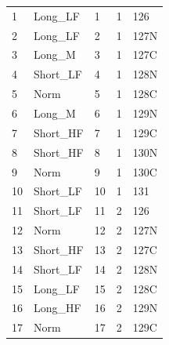 \begin{table}[!ht]
\begin{tabular}{lllll}
1                                         & Long\_LF           & 1                     & 1                & 126       \\
2                                         & Long\_LF           & 2                     & 1                & 127N      \\
3                                         & Long\_M            & 3                     & 1                & 127C      \\
4                                         & Short\_LF          & 4                     & 1                & 128N      \\
5                                         & Norm               & 5                     & 1                & 128C      \\
6                                         & Long\_M            & 6                     & 1                & 129N      \\
7                                         & Short\_HF          & 7                     & 1                & 129C      \\
8                                         & Short\_HF          & 8                     & 1                & 130N      \\
9                                         & Norm               & 9                     & 1                & 130C      \\
10                                        & Short\_LF          & 10                    & 1                & 131       \\
11                                        & Short\_LF          & 11                    & 2                & 126       \\
12                                        & Norm               & 12                    & 2                & 127N      \\
13                                        & Short\_HF          & 13                    & 2                & 127C      \\
14                                        & Short\_LF          & 14                    & 2                & 128N      \\
15                                        & Long\_LF           & 15                    & 2                & 128C      \\
16                                        & Long\_HF           & 16                    & 2                & 129N      \\
17                                        & Norm               & 17                    & 2                & 129C      \\

\end{tabular}
\end{table}

